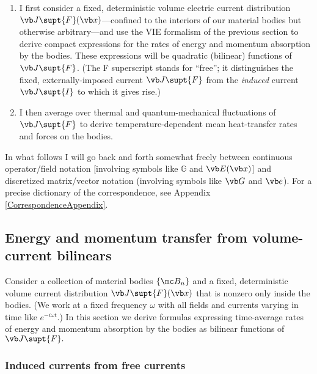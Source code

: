 \documentclass[letterpaper]{article}
\begin{document}
\begin{enumerate}
\item I first consider a fixed, deterministic volume electric 
current distribution $\vb J\supt{F}(\vb x)$---confined to the interiors
of our material bodies but otherwise arbitrary---and use
the VIE formalism of the previous section to derive compact 
expressions for the rates of energy and momentum absorption 
by the bodies. These expressions will be quadratic (bilinear) 
functions of $\vb J\supt{F}$. (The F superscript stands
for ``free''; it distinguishes the fixed, externally-imposed
current $\vb J\supt{F}$ from the \textit{induced} current
$\vb J\supt{I}$ to which it gives rise.)
\item I then average over thermal and quantum-mechanical
fluctuations of $\vb J\supt{F}$ to derive temperature-dependent
mean heat-transfer rates and forces on the bodies.
\end{enumerate}
In what follows I will go back and forth somewhat freely between
continuous operator/field notation 
[involving symbols like $\mathbb{G}$ and $\vb E(\vb x)$] and 
discretized matrix/vector notation 
(involving symbols like $\vb G$ and $\vb e$). For a precise
dictionary of the correspondence, see Appendix \ref{CorrespondenceAppendix}.

\subsection{Energy and momentum transfer from volume-current bilinears}

Consider a collection of material bodies $\{\mc B_n\}$ and a 
fixed, deterministic volume current distribution $\vb J\supt{F}(\vb x)$
that is nonzero only inside the bodies.
(We work at a fixed frequency $\omega$ with all fields and currents 
varying in time like $e^{-i\omega t}.$)
In this section we derive formulas expressing time-average rates 
of energy and momentum absorption by the bodies as bilinear
functions of $\vb J\supt{F}.$

\subsubsection*{Induced currents from free currents}
\end{document}
